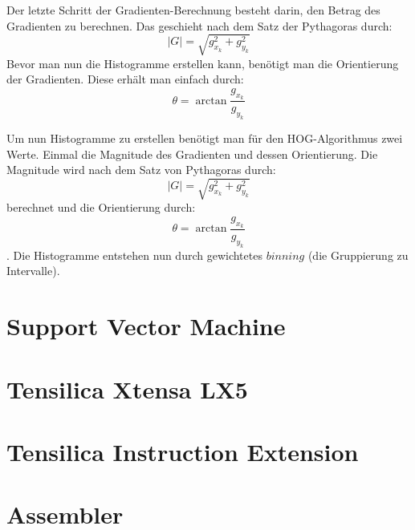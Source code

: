Der letzte Schritt der Gradienten-Berechnung besteht darin, den Betrag  des Gradienten zu berechnen. Das geschieht nach dem Satz der Pythagoras durch:
$$ \lvert G \rvert=\sqrt{g_{x_k}^{2}+g_{y_k}^{2}} $$
Bevor man nun die Histogramme erstellen kann, benötigt man die Orientierung der Gradienten. Diese erhält man einfach durch:
$$ \theta=\arctan\frac{g_{x_k}}{g_{y_k}} $$

Um nun Histogramme zu erstellen benötigt man für den HOG-Algorithmus zwei Werte. Einmal die Magnitude des Gradienten und dessen Orientierung.
Die Magnitude wird nach dem Satz von Pythagoras durch:
$$ \lvert G \rvert=\sqrt{g_{x_k}^{2}+g_{y_k}^{2}} $$
berechnet und die Orientierung durch:
$$ \theta=\arctan\frac{g_{x_k}}{g_{y_k}} $$.
Die Histogramme entstehen nun durch gewichtetes $binning$ (die Gruppierung zu Intervalle). 

\section{Support Vector Machine}
\label{sec:grundlagensvm}

\section{Tensilica Xtensa LX5}
\label{sec:grundlagenlx5}

\section{Tensilica Instruction Extension}
\label{sec:grundlagentie}

\section{Assembler}
\label{sec:grundlagenassembler}				